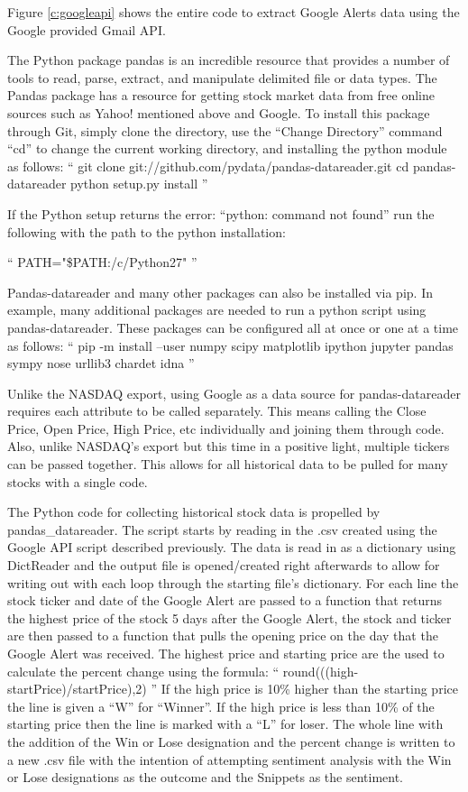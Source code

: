 \documentclass[sigconf]{acmart}
\begin{document}
Figure \ref{c:googleapi} shows the entire code to extract Google Alerts data using the Google provided Gmail API.


The Python package pandas is an incredible resource that provides a number of tools to read, parse, extract, and manipulate delimited file or data types. The Pandas package has a resource for getting stock market data from free online sources such as Yahoo! mentioned above and Google. To install this package through Git, simply clone the directory, use the ``Change Directory'' command ``cd'' to change the current working directory, and installing the python module as follows: 
``
git clone git://github.com/pydata/pandas-datareader.git
cd pandas-datareader
python setup.py install
''


If the Python setup returns the error: ``python: command not found'' run the following with the path to the python installation:

``
PATH="\$PATH:/c/Python27"
''

Pandas-datareader and many other packages can also be installed via pip. In example, many additional packages are needed to run a python script using pandas-datareader. These packages can be configured all at once or one at a time as follows:
``
pip -m install --user numpy scipy matplotlib ipython jupyter pandas sympy nose urllib3 chardet idna
''


Unlike the NASDAQ export, using Google as a data source for pandas-datareader requires each attribute to be called separately. This means calling the Close Price, Open Price, High Price, etc individually and joining them through code. Also, unlike NASDAQ's export but this time in a positive light, multiple tickers can be passed together. This allows for all historical data to be pulled for many stocks with a single code. 

The Python code for collecting historical stock data is propelled by pandas\_datareader. The script starts by reading in the .csv created using the Google API script described previously. The data is read in as a dictionary using DictReader and the output file is opened/created right afterwards to allow for writing out with each loop through the starting file's dictionary. For each line the stock ticker and date of the Google Alert are passed to a function that returns the highest price of the stock 5 days after the Google Alert, the stock and ticker are then passed to a function that pulls the opening price on the day that the Google Alert was received. The highest price and starting price are the used to calculate the percent change using the formula: 
``
round(((high-startPrice)/startPrice),2)
''
If the high price is 10\% higher than the starting price the line is given a ``W'' for ``Winner''. If the high price is less than 10\% of the starting price then the line is marked with a ``L'' for loser. The whole line with the addition of the Win or Lose  designation and the percent change is written to a new .csv file with the intention of attempting sentiment analysis with the Win or Lose designations as the outcome and the Snippets as the sentiment. 
\end{document}
